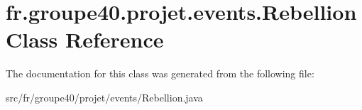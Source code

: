 \hypertarget{classfr_1_1groupe40_1_1projet_1_1events_1_1_rebellion}{}\section{fr.\+groupe40.\+projet.\+events.\+Rebellion Class Reference}
\label{classfr_1_1groupe40_1_1projet_1_1events_1_1_rebellion}


The documentation for this class was generated from the following file\+:\begin{DoxyCompactItemize}
\item 
src/fr/groupe40/projet/events/Rebellion.\+java\end{DoxyCompactItemize}
